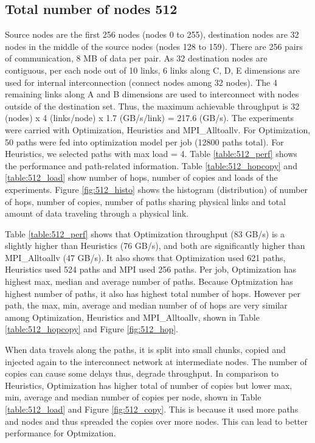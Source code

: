 \documentclass[letter]{article}
\begin{document}
\subsection {Total number of nodes 512}

Source nodes are the first 256 nodes (nodes 0 to 255), destination nodes are 32 nodes in the middle of the source nodes (nodes 128 to 159). There are 256 pairs of communication, 8 MB of data per pair. As 32 destination nodes are contiguous, per each node out of 10 links, 6 links along C, D, E dimensions are used for internal interconnection (connect nodes among 32 nodes). The 4 remaining links along A and B dimensions are used to interconnect with nodes outside of the destination set. Thus, the maximum achievable throughput is 32 (nodes) x 4 (links/node) x 1.7 (GB/s/link) = 217.6 (GB/s). The experiments were carried with Optimization, Heuristics and MPI\_Alltoallv. For Optimization, 50 paths were fed into optimization model per job (12800 paths total). For Heuristics, we selected paths with max load = 4. Table \ref{table:512_perf} shows the performance and path-related information. Table \ref{table:512_hopcopy} and \ref{table:512_load} show number of hops, number of copies and loads of the experiments. Figure \ref{fig:512_histo} shows the histogram (distribution) of number of hops, number of copies, number of paths sharing physical links and total amount of data traveling through a physical link.

Table \ref{table:512_perf} shows that Optimization throughput (83 GB/s) is a slightly higher than Heuristics (76 GB/s), and both are significantly higher than MPI\_Alltoallv (47 GB/s). It also shows that Optimization used 621 paths, Heuristics used 524 paths and MPI used 256 paths. Per job, Optimization has highest max, median and average number of paths. Because Optmization has highest number of paths, it also has highest total number of hops. However per path, the max, min, average and median number of of hops are very similar among Optimization, Heuristics and MPI\_Alltoallv, shown in Table \ref{table:512_hopcopy} and Figure \ref{fig:512_hop}. 

When data travels along the paths, it is split into small chunks, copied and injected again to the interconnect network at intermediate nodes. The number of copies can cause some delays thus, degrade throughput. In comparison to Heuristics, Optimization has higher total of number of copies but lower max, min, average and median number of copies per node, shown in Table \ref{table:512_load} and Figure \ref{fig:512_copy}. This is because it used more paths and nodes and thus spreaded the copies over more nodes. This can lead to better performance for Optmization.
\end{document}
